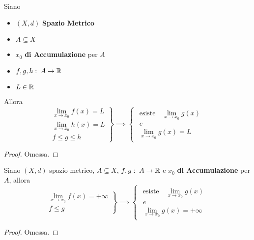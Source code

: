 \begin{theorem}
	\label{teo:carabinieri}
	Siano
	\begin{itemize}[noitemsep]
		\item $(X,d)$ \textbf{Spazio Metrico}
		\item $A \subseteq X$
		\item $x_0$ \textbf{di Accumulazione} per $A$
		\item $f,g,h:\; A \to \mathbb{R}$
		\item $L \in \mathbb{R}$
	\end{itemize}
	Allora
	\[
		\left.
		\begin{array}{c}
			\lim\limits_{x \to x_0} f(x) = L\\
			\lim\limits_{x \to x_0} h(x) = L\\
			f \leq g \leq h
		\end{array}
		\right\}
		\implies
		\begin{cases}
			\begin{array}{c}
				\text{esiste} \quad \lim\limits_{x \to x_0} g(x)\\
				e\\
				\lim\limits_{x \to x_0} g(x) = L
			\end{array}
		\end{cases}
	\]
	\begin{proof}
		Omessa.
	\end{proof}
\end{theorem}
\begin{proposition}
	\label{prop:f_leq_g_lim_f_piu_inf_allora_g_piu_inf}
	Siano $(X,d)$ spazio metrico, $A \subseteq X$, $f,g:\; A \to \mathbb{R}$ e $x_0$ \textbf{di Accumulazione} per $A$, allora
	\[
		\left.
			\begin{array}{c}
				\lim\limits_{x \to x_0} f(x) = +\infty\\
				f \leq g
			\end{array}
		\right\}
		\implies
		\begin{cases}
			\begin{array}{c}
				\text{esiste} \quad \lim\limits_{x \to x_0} g(x)\\
				e\\
				\lim\limits_{x \to x_0} g(x) = +\infty
			\end{array}
		\end{cases}
	\]
	\begin{proof}
		Omessa.
	\end{proof}
\end{proposition}
